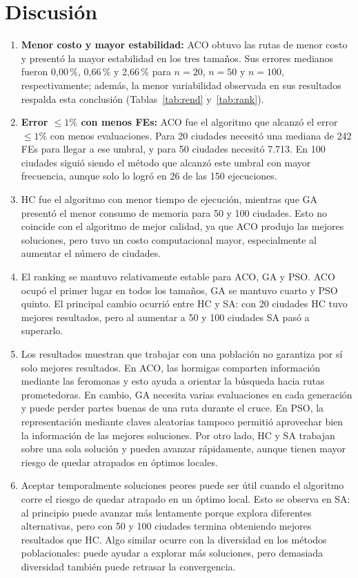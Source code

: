\documentclass[10pt,a4paper]{article}
\begin{document}
\section{Discusión}
\begin{enumerate}[leftmargin=1.2em]
\item \textbf{Menor costo y mayor estabilidad:} ACO obtuvo las rutas de menor costo y presentó la mayor estabilidad en los tres tamaños. Sus errores medianos fueron 0{,}00\,\%, 0{,}66\,\% y 2{,}66\,\% para $n=20$, $n=50$ y $n=100$, respectivamente; además, la menor variabilidad observada en sus resultados respalda esta conclusión (Tablas~\ref{tab:rend} y~\ref{tab:rank}).
\item \textbf{Error $\le1\text{\%}$ con menos FEs:} ACO fue el algoritmo que alcanzó el error $\le1\text{\%}$ con menos evaluaciones. Para 20 ciudades necesitó una mediana de 242 FEs para llegar a ese umbral, y para 50 ciudades necesitó 7.713. En 100 ciudades siguió siendo el método que alcanzó este umbral con mayor frecuencia, aunque solo lo logró en 26 de las 150 ejecuciones.
\item HC fue el algoritmo con menor tiempo de ejecución, mientras que GA presentó el menor consumo de memoria para 50 y 100 ciudades. Esto no coincide con el algoritmo de mejor calidad, ya que ACO produjo las mejores soluciones, pero tuvo un costo computacional mayor, especialmente al aumentar el número de ciudades.
\item El ranking se mantuvo relativamente estable para ACO, GA y PSO. ACO ocupó el primer lugar en todos los tamaños, GA se mantuvo cuarto y PSO quinto. El principal cambio ocurrió entre HC y SA: con 20 ciudades HC tuvo mejores resultados, pero al aumentar a 50 y 100 ciudades SA pasó a superarlo.
\item Los resultados muestran que trabajar con una población no garantiza por sí solo mejores resultados. En ACO, las hormigas comparten información mediante las feromonas y esto ayuda a orientar la búsqueda hacia rutas prometedoras. En cambio, GA necesita varias evaluaciones en cada generación y puede perder partes buenas de una ruta durante el cruce. En PSO, la representación mediante claves aleatorias tampoco permitió aprovechar bien la información de las mejores soluciones. Por otro lado, HC y SA trabajan sobre una sola solución y pueden avanzar rápidamente, aunque tienen mayor riesgo de quedar atrapados en óptimos locales.
\item Aceptar temporalmente soluciones peores puede ser útil cuando el algoritmo corre el riesgo de quedar atrapado en un óptimo local. Esto se observa en SA: al principio puede avanzar más lentamente porque explora diferentes alternativas, pero con 50 y 100 ciudades termina obteniendo mejores resultados que HC. Algo similar ocurre con la diversidad en los métodos poblacionales: puede ayudar a explorar más soluciones, pero demasiada diversidad también puede retrasar la convergencia.

\end{enumerate}
\end{document}
